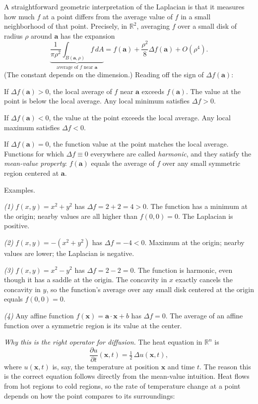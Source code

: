 \documentclass{article}
\begin{document}
A straightforward geometric interpretation of the Laplacian is that it measures how much $f$ at a point differs from the average value of $f$ in a small neighborhood of that point. Precisely, in $\mathbb{R}^2$, averaging $f$ over a small disk of radius $\rho$ around $\mathbf{a}$ has the expansion
$$\underbrace{\frac{1}{\pi\rho^2}\int_{B(\mathbf{a}, \rho)} f\, dA}_{\text{average of } f \text{ near } \mathbf{a}} = f(\mathbf{a}) + \frac{\rho^2}{8}\Delta f(\mathbf{a}) + O(\rho^4).$$
(The constant depends on the dimension.) Reading off the sign of $\Delta f(\mathbf{a})$:
 
If $\Delta f(\mathbf{a}) > 0$, the local average of $f$ near $\mathbf{a}$ exceeds $f(\mathbf{a})$. The value at the point is below the local average. Any local minimum satisfies $\Delta f > 0$.
 
If $\Delta f(\mathbf{a}) < 0$, the value at the point exceeds the local average. Any local maximum satisfies $\Delta f < 0$.
 
If $\Delta f(\mathbf{a}) = 0$, the function value at the point matches the local average. Functions for which $\Delta f \equiv 0$ everywhere are called \textit{harmonic}, and they satisfy the \textit{mean-value property}: $f(\mathbf{a})$ equals the average of $f$ over any small symmetric region centered at $\mathbf{a}$.
 
Examples.

\textit{(1)} $f(x, y) = x^2 + y^2$ has $\Delta f = 2 + 2 = 4 > 0$. The function has a minimum at the origin; nearby values are all higher than $f(0,0) = 0$. The Laplacian is positive.
 
\textit{(2)} $f(x, y) = -(x^2 + y^2)$ has $\Delta f = -4 < 0$. Maximum at the origin; nearby values are lower; the Laplacian is negative.
 
\textit{(3)} $f(x, y) = x^2 - y^2$ has $\Delta f = 2 - 2 = 0$. The function is harmonic, even though it has a saddle at the origin. The concavity in $x$ exactly cancels the concavity in $y$, so the function's average over any small disk centered at the origin equals $f(0,0) = 0$.
 
\textit{(4)} Any affine function $f(\mathbf{x}) = \mathbf{a}\cdot\mathbf{x} + b$ has $\Delta f = 0$. The average of an affine function over a symmetric region is its value at the center.
 
\textit{Why this is the right operator for diffusion.} The heat equation in $\mathbb{R}^n$ is
$$\frac{\partial u}{\partial t}(\mathbf{x}, t) = \tfrac{1}{2}\,\Delta u(\mathbf{x}, t),$$
where $u(\mathbf{x}, t)$ is, say, the temperature at position $\mathbf{x}$ and time $t$. The reason this is the correct equation follows directly from the mean-value intuition. Heat flows from hot regions to cold regions, so the rate of temperature change at a point depends on how the point compares to its surroundings:
 
\end{document}
